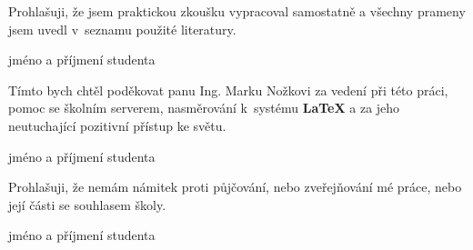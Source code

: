 
\newenvironment{signaturedtext}{}{%
	\newline
    \begin{flushright}
		\begin{minipage}[H]{.5\textwidth}
			\begin{center}
				\dotfill\newline
				jméno a příjmení studenta
			\end{center}		
		\end{minipage}
	\end{flushright}
}

\clearpage
\thispagestyle{empty}

\begin{signaturedtext}
	Prohlašuji, že jsem praktickou zkoušku vypracoval samostatně a všechny prameny jsem uvedl v~seznamu použité literatury.
\end{signaturedtext}

\vspace*{\fill}

\begin{signaturedtext}
	Tímto bych chtěl poděkovat panu Ing. Marku Nožkovi za vedení při této práci, pomoc se školním serverem, nasměrování k~systému \textbf{\LaTeX} a za jeho neutuchající pozitivní přístup ke světu.
\end{signaturedtext}
	
\vfill
	
\begin{signaturedtext}
	Prohlašuji, že nemám námitek proti půjčování, nebo zveřejňování mé práce, nebo její části se souhlasem školy.
\end{signaturedtext}

\clearpage